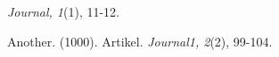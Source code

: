 \documentclass{article}
\begin{document}
  \parencite{Author2022}







\parencite{Another1000}



\section{}

\emph{Journal, 1}(1), 11-12.

Another. (1000). Artikel. \emph{Journal1, 2}(2), 99-104.
\end{document}
